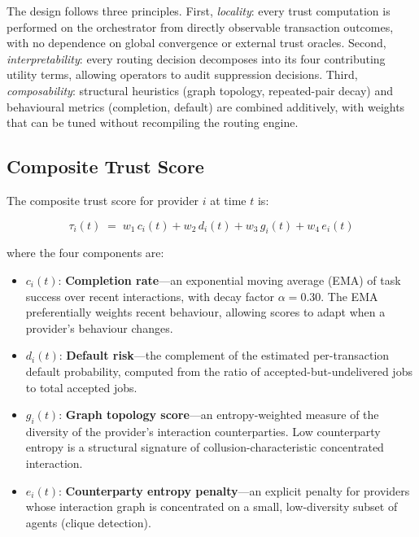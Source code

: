 \documentclass[sigconf,nonacm,10pt]{acmart}
\begin{document}
The design follows three principles. First, \emph{locality}: every
trust computation is performed on the orchestrator from directly
observable transaction outcomes, with no dependence on global
convergence or external trust oracles. Second,
\emph{interpretability}: every routing decision decomposes into
its four contributing utility terms, allowing operators to audit
suppression decisions. Third, \emph{composability}: structural
heuristics (graph topology, repeated-pair decay) and behavioural
metrics (completion, default) are combined additively, with
weights that can be tuned without recompiling the routing engine.

\subsection{Composite Trust Score}
\label{sec:composite}

The composite trust score for provider $i$ at time $t$ is:

\begin{equation}
  \tau_i(t) \;=\; w_1\, c_i(t) + w_2\, d_i(t) + w_3\, g_i(t)
            + w_4\, e_i(t)
  \label{eq:composite}
\end{equation}

where the four components are:

\begin{itemize}[leftmargin=*,topsep=2pt,itemsep=2pt]
  \item $c_i(t)$: \textbf{Completion rate}---an exponential moving
        average (EMA) of task success over recent interactions,
        with decay factor $\alpha = 0.30$. The EMA preferentially
        weights recent behaviour, allowing scores to adapt when a
        provider's behaviour changes.
  \item $d_i(t)$: \textbf{Default risk}---the complement of the
        estimated per-transaction default probability, computed
        from the ratio of accepted-but-undelivered jobs to total
        accepted jobs.
  \item $g_i(t)$: \textbf{Graph topology score}---an
        entropy-weighted measure of the diversity of the provider's
        interaction counterparties. Low counterparty entropy is a
        structural signature of collusion-characteristic
        concentrated interaction.
  \item $e_i(t)$: \textbf{Counterparty entropy penalty}---an
        explicit penalty for providers whose interaction graph is
        concentrated on a small, low-diversity subset of agents
        (clique detection).
\end{itemize}
\end{document}
